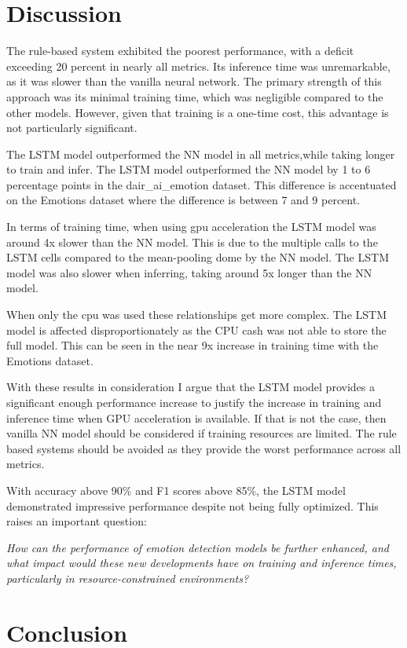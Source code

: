 \section{Discussion}

The rule-based system exhibited the poorest performance, with a deficit
exceeding 20 percent in nearly all metrics. Its inference time was
unremarkable, as it was slower than the vanilla neural network. The primary
strength of this approach was its minimal training time, which was negligible
compared to the other models. However, given that training is a one-time cost,
this advantage is not particularly significant.

The LSTM model outperformed the NN model in all metrics,while taking longer to
train and infer. The LSTM model outperformed the NN model by 1 to 6 percentage
points in the dair\_ai\_emotion dataset.
This difference is accentuated on the Emotions dataset where the difference is
between 7 and 9 percent.

In terms of training time, when using gpu acceleration the LSTM model was
around 4x slower than the NN model. This is due to the multiple calls to the
LSTM cells compared to the mean-pooling dome by the NN model. The LSTM model
was
also slower when inferring, taking around 5x longer than the NN model.

When only the cpu was used these relationships get more complex. The LSTM model
is affected disproportionately as the CPU cash was not able to store the full
model. This can be seen in the near 9x increase in training time with the
Emotions dataset.

With these results in consideration I argue that the LSTM model provides a
significant enough performance increase to justify the increase in training
and inference time when GPU acceleration is available. If that is not the case,
then vanilla NN model should be considered if training resources are limited.
The rule based systems should be avoided as they provide the worst performance
across all metrics.

With accuracy above 90\% and F1 scores above 85\%, the LSTM model demonstrated
impressive performance despite not being fully optimized. This raises an
important question:

\textit{How can the performance of emotion detection models be further
    enhanced, and what impact would these new developments have on
    training and inference times, particularly in resource-constrained
    environments?}

\section{Conclusion}

